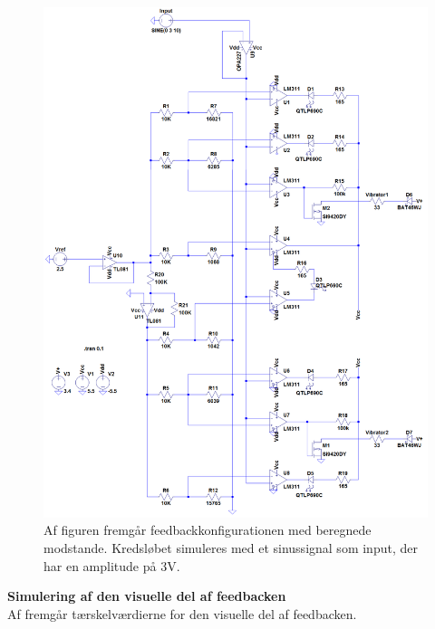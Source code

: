 \begin{figure}[H]
	\centering
	\includegraphics[scale=0.4]{figures/cProblemloesning/komparator_samlet.PNG}
	\caption{Af figuren fremgår feedbackkonfigurationen med beregnede modstande. Kredsløbet simuleres med et sinussignal som input, der har en amplitude på $3$V.}
	\label{fig:komparator_samlet}
\end{figure}
 
\noindent\textbf{Simulering af den visuelle del af feedbacken} \\
Af  fremgår tærskelværdierne for den visuelle del af feedbacken. 

